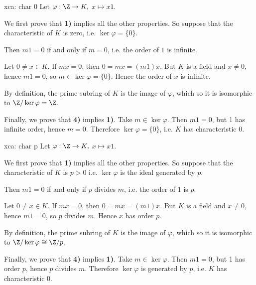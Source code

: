 \begin{sol}{xca: char 0}
Let $\varphi:\Z\to K,$ $x\mapsto x1$.

We first prove that \textbf{1)} implies all the other 
properties. So suppose that the characteristic of $K$ is zero, i.e. $\ker\varphi=\{0\}$. 

Then $m1=0$ if and only if $m=0$, i.e.
the order of $1$ is infinite.

Let $0\neq x\in K$. If $mx=0$, then $0=mx=(m1)x$.
But $K$ is a field and $x\neq 0$, hence $m1=0$,
so $m\in\ker\varphi=\{0\}$.
Hence the order of $x$ is infinite.

By definition, the prime subring of $K$ is
the image of $\varphi$, which 
so it is isomorphic to $\Z/\ker\varphi=\Z$.

Finally, we prove that \textbf{4)} implies \textbf{1)}.
Take $m\in\ker\varphi$. Then $m1=0$,
but 1 has infinite order, hence $m=0$.
Therefore $\ker\varphi=\{0\}$, 
i.e. $K$ has characteristic 0.
\end{sol}

\begin{sol}{xca: char p}
Let $\varphi:\Z\to K,$ $x\mapsto x1$.

We first prove that \textbf{1)} implies all the other 
properties. So suppose that the characteristic of $K$ is $p>0$ i.e. $\ker\varphi$ is the ideal generated by $p$. 

Then $m1=0$ if and only if $p$ divides $m$, i.e.
the order of $1$ is $p$.

Let $0\neq x\in K$. If $mx=0$, then $0=mx=(m1)x$.
But $K$ is a field and $x\neq 0$, hence $m1=0$,
so $p$ divides $m$.
Hence $x$ has order $p$.

By definition, the prime subring of $K$ is
the image of $\varphi$, which 
so it is isomorphic to $\Z/\ker\varphi\cong \Z/p$.

Finally, we prove that \textbf{4)} implies \textbf{1)}.
Take $m\in\ker\varphi$. Then $m1=0$,
but 1 has order $p$, hence $p$ divides $m$.
Therefore $\ker\varphi$ is generated by $p$, 
i.e. $K$ has characteristic 0.
\end{sol}

